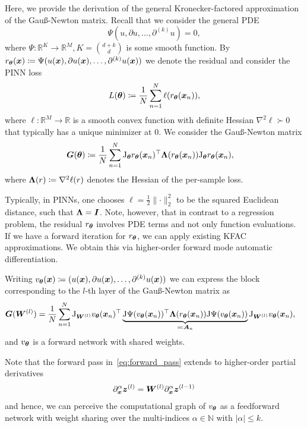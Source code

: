 Here, we provide the derivation of the general Kronecker-factored approximation of the Gauß-Newton matrix. 
Recall that we consider the general PDE
\begin{equation}
    \Psi(u, \partial u, \dots, \partial^{(k)} u) = 0,
\end{equation}
where $\Psi\colon \mathbb R^{K}\to\mathbb R^M, K=\binom{d+k}{d}$ is some smooth function.
By $r_{\bm{\theta}}({\bm{x}})\coloneqq \Psi(u({\bm{x}}), \partial u({\bm{x}}), \dots, \partial^{(k)} u({\bm{x}}))$ we denote the residual and consider the PINN loss
\begin{equation}
    L({\bm{\theta}})\coloneqq \frac1N\sum_{n=1}^N \ell(r_{{\bm{\theta}}}({\bm{x}}_n)),
\end{equation}
where $\ell\colon\mathbb R^M\to\mathbb R$ is a smooth convex function with definite Hessian $\nabla^2\ell\succ0$ that typically has a unique minimizer at $0$. 
We consider the Gauß-Newton matrix
\begin{align}
    {\bm{G}}({\bm{\theta}}) & \coloneqq \frac1N\sum_{n=1}^N \mathrm{J}_{\bm{\theta}} r_{\bm{\theta}}({\bm{x}}_n)^\top {\bm{\Lambda}}(r_{\bm{\theta}}({\bm{x}}_n)) \mathrm{J}_{\bm{\theta}} r_{\bm{\theta}}({\bm{x}}_n),
\end{align}
where ${\bm{\Lambda}}(r)\coloneqq \nabla^2 \ell(r)$ denotes the Hessian of the per-sample loss. 

Typically, in PINNs, one chooses $\ell = \frac12\lVert \cdot \rVert_2^2$ to be the squared Euclidean distance, such that ${\bm{\Lambda}} = {\bm{I}}$.
Note, however, that in contrast to a regression problem, the residual $r_{\bm{\theta}}$ involves PDE terms and not only function evaluations.
If we have a forward iteration for $r_{\bm{\theta}}$, we can apply existing KFAC approximations.
We obtain this via higher-order forward mode automatic differentiation.

Writing $v_\vtheta(\vx)\coloneqq (%
u(\vx), \partial u(\vx), \dots, \partial^{(k)} u(\vx))$
we can express the block corresponding to the $l$-th layer of the Gauß-Newton matrix as 
\begin{align}
    {\bm{G}}({\bm{W}}^{(l)}) & = \frac1N\sum_{n=1}^N \mathrm{J}_{{\bm{W}}^{(l)}} v_{\bm{\theta}}({\bm{x}}_n)^\top \underbrace{\mathrm{J} \Psi(v_{\bm{\theta}}({\bm{x}}_n))^\top {\bm{\Lambda}}(r_{\bm{\theta}}({\bm{x}}_n)) \mathrm{J} \Psi(v_{\bm{\theta}}({\bm{x}}_n))}_{\eqqcolon {\bm{A}}_n}  \mathrm{J}_{{\bm{W}}^{(l)}} v_{\bm{\theta}}({\bm{x}}_n),
\end{align}
and $v_{\bm{\theta}}$ is a forward network with shared weights.

Note that the forward pass in~\eqref{eq:forward_pass} extends to higher-order partial derivatives 
\begin{align}
    \partial_{\bm{x}}^\alpha {\bm{z}}^{(l)} = {\bm{W}}^{(l)}\partial_{\bm{x}}^\alpha {\bm{z}}^{(l-1)} 
\end{align}
and hence, we can perceive the computational graph of $v_{\bm{\theta}}$ as a feedforward network with weight sharing over the multi-indices $\alpha\in\mathbb N$ with $\lvert \alpha \rvert \le k$.

